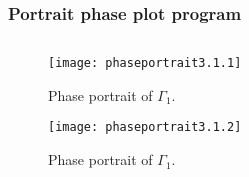 \documentclass[
    8pt,
    aspectratio=1610,
    c,
    intlimits,
    leqno,
    professionalfonts,
]{beamer}
\begin{document}
\begin{frame}[fragile]
	\frametitle{Portrait phase plot program}
	\inputminted[fontsize=\tiny,firstline=1,lastline=25]{python}{phaseportrait.py}
\end{frame}

\begin{frame}
	\begin{figure}[ht!]
		\centering
		\texttt{[image: phaseportrait3.1.1]}
		\caption{Phase portrait of $\Gamma_{1}$.}
	\end{figure}
\end{frame}

\begin{frame}
	\begin{figure}[ht!]
		\centering
		\texttt{[image: phaseportrait3.1.2]}
		\caption{Phase portrait of $\Gamma_{1}$.}
	\end{figure}
\end{frame}
\end{document}
